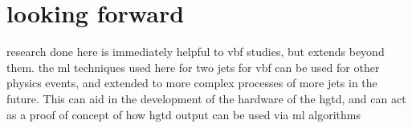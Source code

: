 \documentclass[paper=a4,fontsize=12pt]{article}
\begin{document}
\section*{looking forward}
    research done here is immediately helpful to vbf studies, but extends beyond them. 
    the ml techniques used here for two jets for vbf can be used for other physics events,
    and extended to more complex processes of more jets in the future.
    This can aid in the development of the hardware of the hgtd,
    and can act as a proof of concept of how hgtd output can be used via ml algorithms

    
\end{document}
